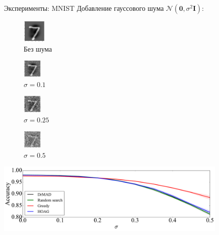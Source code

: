 \documentclass[10pt,pdf,utf8,russian,aspectratio=169]{beamer}
\begin{document}
\begin{frame}{Эксперименты: MNIST}
Добавление гауссового шума $\mathcal{N}(\mathbf{0},\sigma^2\mathbf{I})$:
\setlength{\columnsep}{10pt}
\begin{multicols}{4}
\begin{figure}[h]
\includegraphics[width=0.10\textwidth]{./mnist0.png}
\caption*{Без шума}
\end{figure}

\begin{figure}[h]
\includegraphics[width=0.08\textwidth]{./mnist10.png}
\caption*{$\sigma=0.1$}
\end{figure}

\begin{figure}[h]
\includegraphics[width=0.08\textwidth]{./mnist25.png}
\caption*{$\sigma=0.25$}
\end{figure}

\begin{figure}[h]
\includegraphics[width=0.08\textwidth]{./mnist50.png}
\caption*{$\sigma=0.5$}
\end{figure}
\end{multicols}
\begin{center}
\includegraphics[width=0.85\textwidth]{Fig_noise.pdf}
\end{center}
\end{frame}
\end{document}
